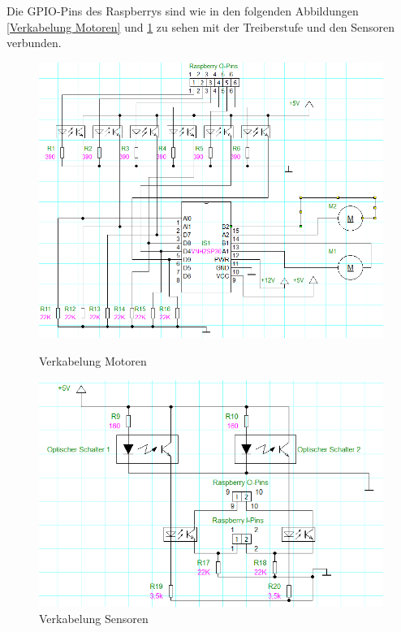 \vspace{10pt}

Die GPIO-Pins des Raspberrys sind wie in den folgenden Abbildungen \ref{Verkabelung Motoren} und \ref{Verkabelung Sensoren} zu sehen mit der Treiberstufe und den Sensoren verbunden.
\begin{figure}[H]
  \begin{minipage}[hbt]{0.5\textwidth}
    \includegraphics[width=1\textwidth]{Bilder/RaspberryPinVerkabelung/Motoransteuerung}
 	\caption{Verkabelung Motoren}
  	\label{Verkabelung Motoren}
  \end{minipage}
\hspace{.03\linewidth}
  \begin{minipage}[hbt]{0.5\textwidth}
    \includegraphics[width=1\textwidth]{Bilder/RaspberryPinVerkabelung/Sensoransteuerung}
  	\caption{Verkabelung Sensoren}
  	\label{Verkabelung Sensoren}
  \end{minipage}
  \vspace{0pt}
\end{figure}

